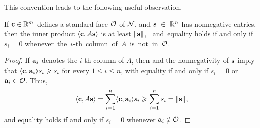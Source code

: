 \documentclass[11pt]{amsart}
\begin{document}
This convention leads to the following useful observation.


\begin{proposition}\label{prop: inner product with columns of A}
   If $\mathbf{c} \in \mathbb{R}^m$ defines a standard face $\mathcal{O}$ of $\mathcal{N}$, and $\mathbf{s}~\in~\mathbb{R}^n$ has nonnegative entries, then the inner product $\langle \mathbf{c}, A\mathbf{s} \rangle$ is at least $\| \mathbf{s} \|$, ~and~equality holds if and only if $s_i = 0$ whenever~the~$i$-th~column~of~$A$~is~not~in~$\mathcal{O}$.
\end{proposition}

\begin{proof}
If $\mathbf{a}_i$ denotes the $i$-th column of $A$, then  and the nonnegativity of $\mathbf{s}$ imply that $\langle \mathbf{c}, \mathbf{a}_i \rangle  s_i \geqslant s_i$ for every $1 \leq i \leq n$, with equality if and only if $s_i = 0$ or $\mathbf{a}_i \in \mathcal{O}$.
Thus,
\[ \langle \mathbf{c}, A\mathbf{s} \rangle = \sum_{i=1}^n \langle \mathbf{c}, \mathbf{a}_i \rangle s_i \geqslant  \sum_{i=1}^n s_i  = \| \mathbf{s} \|,\]
and equality holds if and only if $s_i = 0$ whenever $\mathbf{a}_i \notin \mathcal{O}$.
\end{proof}



\end{document}
